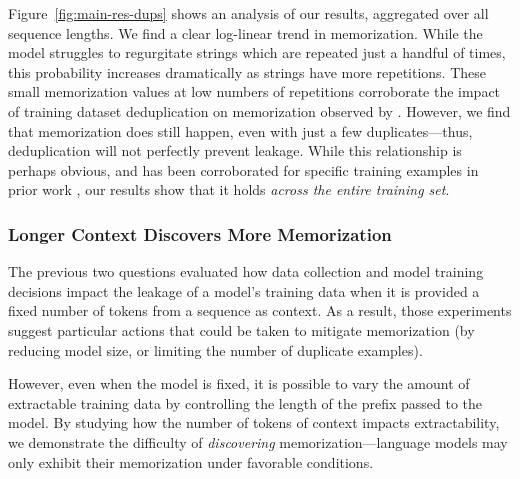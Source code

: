 Figure~\ref{fig:main-res-dups} shows an analysis of our results, aggregated over all sequence lengths.
We find a clear log-linear trend in memorization. While the model struggles to regurgitate strings which are repeated just a handful of times, this probability increases dramatically as strings have more repetitions.
%
These small memorization values at low numbers of repetitions corroborate the impact of training dataset deduplication on memorization observed by \citet{lee2021deduplicating}.
%
However, we find that memorization does still happen, even with just a few duplicates---thus, deduplication will not perfectly prevent leakage.
%
While this relationship is perhaps obvious, and has been corroborated for specific training examples in prior work \citep{carlini2019secret, carlini2020extracting}, our results show that it holds \emph{across the entire training set}.


\subsubsection{Longer Context Discovers More Memorization}
\label{sec:context}
The previous two questions evaluated how data collection and model training decisions impact the leakage of a model's training data when it is provided a fixed number of tokens from a sequence as context.
As a result, those experiments suggest particular actions that could be taken to mitigate memorization (by reducing model size, or limiting the number of duplicate examples).

However, even when the model is fixed, it is possible to vary the amount of extractable training data by controlling the length of the prefix passed to the model. 
By studying how the number of tokens of context impacts extractability, we demonstrate the difficulty of \emph{discovering} memorization---language models may only exhibit their memorization under favorable conditions.


